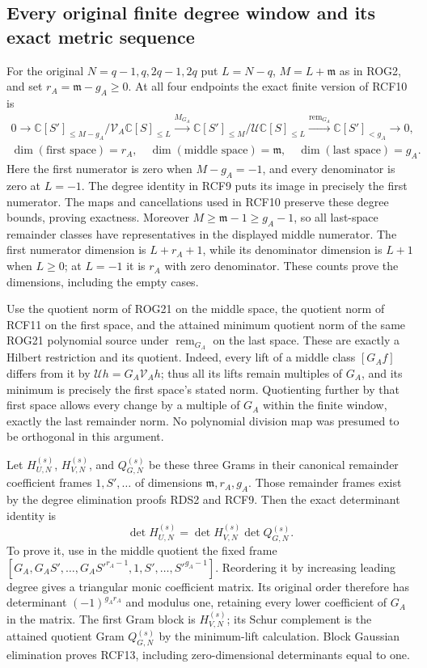 \documentclass[11pt,a4paper]{article}
\begin{document}
\subsection{Every original finite degree window and its exact metric sequence}

For the original $N=q-1,q,2q-1,2q$ put
$L=N-q$, $M=L+\mathfrak m$ as in ROG2, and set
$r_A=\mathfrak m-g_A\ge0$. At all four endpoints the exact
finite version of RCF10 is
\[
 \begin{gathered}
 0\longrightarrow
 \mathbb C[S']_{\le M-g_A}/\mathcal V_A\mathbb C[S]_{\le L}
 \xrightarrow{M_{G_A}}
 \mathbb C[S']_{\le M}/\mathcal U\mathbb C[S]_{\le L}
 \xrightarrow{\operatorname{rem}_{G_A}}
 \mathbb C[S']_{<g_A}\longrightarrow0,\\
 \dim(\text{first space})=r_A,\quad
 \dim(\text{middle space})=\mathfrak m,\quad
 \dim(\text{last space})=g_A.
 \end{gathered}\tag{RCF12}
\]
Here the first numerator is zero when $M-g_A=-1$, and every
denominator is zero at $L=-1$. The degree identity in RCF9
puts its image in precisely the first numerator. The maps
and cancellations used in RCF10 preserve these degree bounds,
proving exactness. Moreover $M\ge\mathfrak m-1\ge g_A-1$,
so all last-space remainder classes have representatives in
the displayed middle numerator. The first numerator dimension
is $L+r_A+1$, while its denominator dimension is $L+1$
when $L\ge0$; at $L=-1$ it is $r_A$ with zero denominator.
These counts prove the dimensions, including the empty cases.

Use the quotient norm of ROG21 on the middle space, the
quotient norm of RCF11 on the first space, and the attained
minimum quotient norm of the same ROG21 polynomial source
under $\operatorname{rem}_{G_A}$ on the last space. These
are exactly a Hilbert restriction and its quotient. Indeed,
every lift of a middle class $[G_Af]$ differs from it by
$\mathcal Uh=G_A\mathcal V_Ah$; thus all its lifts remain
multiples of $G_A$, and its minimum is precisely the first
space's stated norm. Quotienting further by that first space
allows every change by a multiple of $G_A$ within the finite
window, exactly the last remainder norm. No polynomial
division map was presumed to be orthogonal in this argument.

Let $H_{U,N}^{(s)}$, $H_{V,N}^{(s)}$, and $Q_{G,N}^{(s)}$
be these three Grams in their canonical remainder coefficient
frames $1,S',\ldots$ of dimensions $\mathfrak m,r_A,g_A$.
Those remainder frames exist by the degree elimination proofs
RDS2 and RCF9. Then the exact determinant identity is
\[
 \det H_{U,N}^{(s)}
             =\det H_{V,N}^{(s)}\det Q_{G,N}^{(s)}.
 \tag{RCF13}
\]
To prove it, use in the middle quotient the fixed frame
$[G_A,G_AS',\ldots,G_AS'^{r_A-1},1,S',\ldots,S'^{g_A-1}]$.
Reordering it by increasing leading degree gives a triangular
monic coefficient matrix. Its original order therefore has
determinant $(-1)^{g_Ar_A}$ and modulus one, retaining every
lower coefficient of $G_A$ in the matrix. The first Gram
block is $H_{V,N}^{(s)}$; its Schur complement is the
attained quotient Gram $Q_{G,N}^{(s)}$ by the minimum-lift
calculation. Block Gaussian elimination proves RCF13,
including zero-dimensional determinants equal to one.
\end{document}
